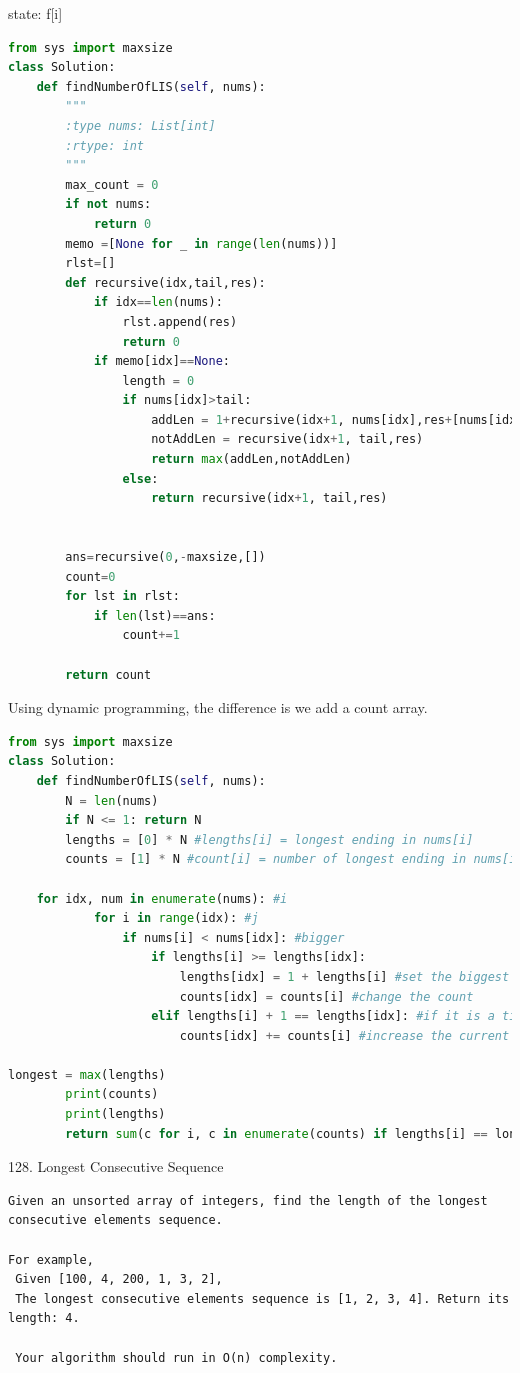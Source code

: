 \documentclass[../specific-algorithms.tex]{subfiles}
\begin{document}
state: f[i]
\begin{lstlisting}[language = Python]
from sys import maxsize
class Solution:
    def findNumberOfLIS(self, nums):
        """
        :type nums: List[int]
        :rtype: int
        """
        max_count = 0
        if not nums:
            return 0
        memo =[None for _ in range(len(nums))]
        rlst=[]
        def recursive(idx,tail,res):
            if idx==len(nums):
                rlst.append(res)
                return 0
            if memo[idx]==None:
                length = 0
                if nums[idx]>tail:
                    addLen = 1+recursive(idx+1, nums[idx],res+[nums[idx]])
                    notAddLen = recursive(idx+1, tail,res)
                    return max(addLen,notAddLen)
                else:
                    return recursive(idx+1, tail,res)
        
        
        ans=recursive(0,-maxsize,[])
        count=0
        for lst in rlst:
            if len(lst)==ans:
                count+=1
                
        return count
\end{lstlisting}

Using dynamic programming, the difference is we add a count array.
\begin{lstlisting}[language = Python]
from sys import maxsize
class Solution:
    def findNumberOfLIS(self, nums):
        N = len(nums)
        if N <= 1: return N
        lengths = [0] * N #lengths[i] = longest ending in nums[i]
        counts = [1] * N #count[i] = number of longest ending in nums[i]

    for idx, num in enumerate(nums): #i
            for i in range(idx): #j
                if nums[i] < nums[idx]: #bigger 
                    if lengths[i] >= lengths[idx]:
                        lengths[idx] = 1 + lengths[i] #set the biggest length
                        counts[idx] = counts[i] #change the count
                    elif lengths[i] + 1 == lengths[idx]: #if it is a tie
                        counts[idx] += counts[i] #increase the current count by count[i]

longest = max(lengths)
        print(counts)
        print(lengths)
        return sum(c for i, c in enumerate(counts) if lengths[i] == longest)
\end{lstlisting}

128. Longest Consecutive Sequence
\begin{lstlisting}
Given an unsorted array of integers, find the length of the longest consecutive elements sequence.

For example,
 Given [100, 4, 200, 1, 3, 2],
 The longest consecutive elements sequence is [1, 2, 3, 4]. Return its length: 4.
 
 Your algorithm should run in O(n) complexity.
 \end{lstlisting}
\end{document}
